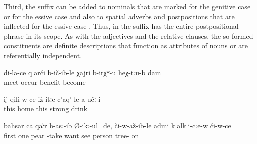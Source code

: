 Third, the suffix can be added to nominals that are marked for the genitive case  or for the essive case  and also to spatial adverbs and postpositions that are inflected for the essive case . Thus, in  the suffix has the entire postpositional phrase in its scope. As with the adjectives and the relative clauses, the so-formed constituents are definite descriptions that function as attributes of nouns or are referentially independent.
%
\begin{exe}
	\ex	\label{ex:‎‎‎It happens to me that I come across my (milk) there minor}
	\gll	di-la-ce	qːarči	b-ič-ib-le	χajri	b-irχʷ-u	heχ-tːu-b	dam\\
			meet	occur	benefit	become			\\
	\glt	{}

	\ex	\label{ex:‎The other one (son) who was at home did not drink that much minor}
	\gll	ij	qili-w-ce	iž-itːe	c'aq'-le	a-učː-i\\
		this	home	this\tsc{-advz}	strong	drink\\
	\glt	{}

	\ex	\label{ex:‎‎‎First he wanted to take one pear, when he saw the man who was on the tree minor}
	\gll	bahsar	ca	qaˁr	h-asː-ib	Ø-ikː-ul=de,	či-w-až-ib-le	admi	kːalkːi-cːe-w	či-w-ce\\
		first	one	pear	-take	want	see	person	tree-	on\\
	\glt	{}
\end{exe}

